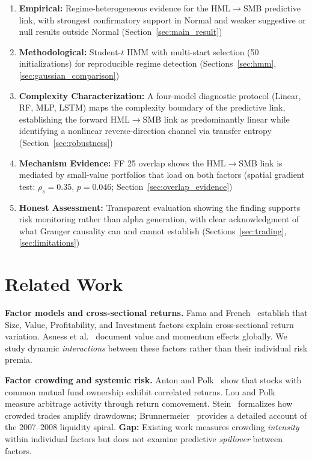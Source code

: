 \documentclass{uai2026}
\begin{document}
\begin{enumerate}
    \item \textbf{Empirical:} Regime-heterogeneous evidence for the HML$\to$SMB
    predictive link, with strongest confirmatory support in Normal and weaker
    suggestive or null results outside Normal (Section~\ref{sec:main_result})

    \item \textbf{Methodological:} Student-$t$ HMM with multi-start selection
    (50 initializations) for reproducible regime detection
    (Sections~\ref{sec:hmm}, \ref{sec:gaussian_comparison})

    \item \textbf{Complexity Characterization:} A four-model diagnostic protocol
    (Linear, RF, MLP, LSTM) maps the complexity boundary of the predictive link,
    establishing the forward HML$\to$SMB link as predominantly linear while
    identifying a nonlinear reverse-direction channel via transfer entropy
    (Section~\ref{sec:robustness})

\item \textbf{Mechanism Evidence:} FF 25 overlap shows the HML$\to$SMB link is
mediated by small-value portfolios that load on both factors (spatial gradient test:
$\rho_s = 0.35$, $p = 0.046$; Section~\ref{sec:overlap_evidence})

    \item \textbf{Honest Assessment:} Transparent evaluation showing the finding
    supports risk monitoring rather than alpha generation, with clear acknowledgment
    of what Granger causality can and cannot establish
    (Sections~\ref{sec:trading}, \ref{sec:limitations})
\end{enumerate}

\section{Related Work}

\textbf{Factor models and cross-sectional returns.}
Fama and French~\cite{fama1993common,fama2015five} establish that Size, Value,
Profitability, and Investment factors explain cross-sectional return variation.
Asness et al.~\cite{asness2013value} document value and momentum effects globally.
We study dynamic \emph{interactions} between these factors rather than their
individual risk premia.

\textbf{Factor crowding and systemic risk.}
Anton and Polk~\cite{anton2014connected} show that stocks with common mutual fund
ownership exhibit correlated returns. Lou and Polk~\cite{lou2022comomentum} measure
arbitrage activity through return comovement. Stein~\cite{stein2009presidential}
formalizes how crowded trades amplify drawdowns; Brunnermeier~\cite{brunnermeier2009deciphering}
provides a detailed account of the 2007--2008 liquidity spiral.
\textbf{Gap:} Existing work measures crowding \emph{intensity} within individual
factors but does not examine predictive \emph{spillover} between factors.
\end{document}
